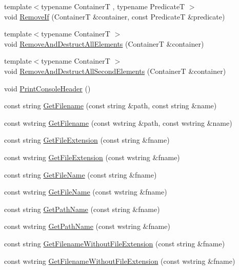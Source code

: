 \begin{DoxyCompactItemize}
\item 
{\footnotesize template$<$typename ContainerT , typename PredicateT $>$ }\\void \hyperlink{namespacemage_a403ff95eb779de1fbbf139661feb2d1b}{Remove\+If} (ContainerT \&container, const PredicateT \&predicate)
\item 
{\footnotesize template$<$typename ContainerT $>$ }\\void \hyperlink{namespacemage_a56c8c38aee820faf885024ed22e70a8e}{Remove\+And\+Destruct\+All\+Elements} (ContainerT \&container)
\item 
{\footnotesize template$<$typename ContainerT $>$ }\\void \hyperlink{namespacemage_aa3db059e4b0563e46cdf3a3a369c3288}{Remove\+And\+Destruct\+All\+Second\+Elements} (ContainerT \&container)
\item 
void \hyperlink{namespacemage_a064756443bd8a1af6974f22c81d29ed0}{Print\+Console\+Header} ()
\item 
const string \hyperlink{namespacemage_aa85467b1af6c9f14e93178cbfd6ca022}{Get\+Filename} (const string \&path, const string \&name)
\item 
const wstring \hyperlink{namespacemage_a42580a2b02794193143aea32e3c815b5}{Get\+Filename} (const wstring \&path, const wstring \&name)
\item 
const string \hyperlink{namespacemage_a4da638506a9dda4f16c41a1a00c0d0e1}{Get\+File\+Extension} (const string \&fname)
\item 
const wstring \hyperlink{namespacemage_a2818c96634f4c8d49dcc4144395b24ef}{Get\+File\+Extension} (const wstring \&fname)
\item 
const string \hyperlink{namespacemage_a167010e334287f9369b15564802a770b}{Get\+File\+Name} (const string \&fname)
\item 
const wstring \hyperlink{namespacemage_ac643523ad89ca58419a2cac93912693b}{Get\+File\+Name} (const wstring \&fname)
\item 
const string \hyperlink{namespacemage_ab3642c6ef6cf94a62fb37b40c3c2f57e}{Get\+Path\+Name} (const string \&fname)
\item 
const wstring \hyperlink{namespacemage_ad23faa6d1854d389eb37fbdeefe97361}{Get\+Path\+Name} (const wstring \&fname)
\item 
const string \hyperlink{namespacemage_ab8841cbab507ef81edb00278110553ad}{Get\+Filename\+Without\+File\+Extension} (const string \&fname)
\item 
const wstring \hyperlink{namespacemage_aac01c0fba57d6737fcf32155748e95b0}{Get\+Filename\+Without\+File\+Extension} (const wstring \&fname)

\end{DoxyCompactItemize}
